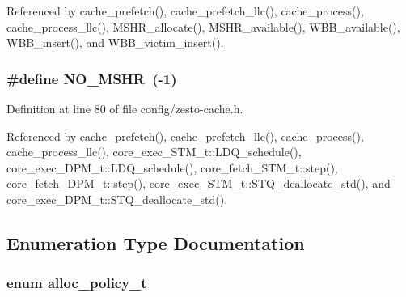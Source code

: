 Referenced by cache\_\-prefetch(), cache\_\-prefetch\_\-llc(), cache\_\-process(), cache\_\-process\_\-llc(), MSHR\_\-allocate(), MSHR\_\-available(), WBB\_\-available(), WBB\_\-insert(), and WBB\_\-victim\_\-insert().
\subsubsection[{NO\_\-MSHR}]{\setlength{\rightskip}{0pt plus 5cm}\#define NO\_\-MSHR~(-1)}\label{config_2zesto-cache_8h_47d3ac5bd49bbf1ff15859f38059ac97}




Definition at line 80 of file config/zesto-cache.h.

Referenced by cache\_\-prefetch(), cache\_\-prefetch\_\-llc(), cache\_\-process(), cache\_\-process\_\-llc(), core\_\-exec\_\-STM\_\-t::LDQ\_\-schedule(), core\_\-exec\_\-DPM\_\-t::LDQ\_\-schedule(), core\_\-fetch\_\-STM\_\-t::step(), core\_\-fetch\_\-DPM\_\-t::step(), core\_\-exec\_\-STM\_\-t::STQ\_\-deallocate\_\-std(), and core\_\-exec\_\-DPM\_\-t::STQ\_\-deallocate\_\-std().

\subsection{Enumeration Type Documentation}
\subsubsection[{alloc\_\-policy\_\-t}]{\setlength{\rightskip}{0pt plus 5cm}enum {\bf alloc\_\-policy\_\-t}}\label{config_2zesto-cache_8h_143ef0e79644952fb702e2fc59039a97}


